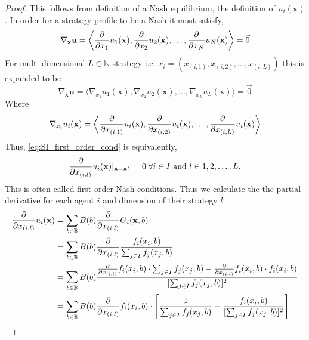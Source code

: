 \documentclass{article}
\newcommand {\N}{\mathbb{N}}
\newcommand {\B}{\mathbb{B}}
\begin{document}
            \begin{proof}
                This follows from definition of a Nash equilibrium, the definition of $u_i(\mathbf{x})$. In order for a strategy profile to be a Nash it must satisfy,
                \begin{equation}
                    \nabla_{\mathbf{x}}\mathbf{u}=\left\langle \pdv{}{x_1}u_1(\mathbf{x}),\pdv{}{x_2}u_2(\mathbf{x}),\dots, \pdv{}{x_N}u_N(\mathbf{x})\right\rangle =\Vec{0}
                \end{equation}
                For  multi dimensional $L\in \N$ strategy i.e. $x_i=(x_{(i,1)},x_{(i,2)},\dots,x_{(i,L)})$ this is expanded to be 
                \begin{equation}
                    \nabla_{\mathbf{x}}\mathbf{u}=\langle \nabla_{x_1}u_1(\mathbf{x}),\nabla_{x_2}u_2(\mathbf{x}),\dots,\nabla_{x_L}u_L(\mathbf{x}) \rangle =\Vec{0} \label{eq:SI_first_order_cond}
                \end{equation}
                Where 
                \begin{equation}
                   \nabla_{x_i}u_i(\mathbf{x})=\left\langle \pdv{}{x_{(i,1)}}u_i(\mathbf{x}),\pdv{}{x_{(i,2)}}u_i(\mathbf{x}),\dots, \pdv{}{x_{(i,L)}}u_i(\mathbf{x})\right\rangle
                \end{equation}
                Thus, \cref{eq:SI_first_order_cond} is equivalently,
                \begin{equation}
                    \pdv{}{x_{(i,l)}}u_i(\mathbf{x})|_{\mathbf{x}=\mathbf{x^*}}=0\; \forall i\in I \text{  and } l\in 1,2,\dots,L. 
                \end{equation}
                This is often called first order Nash conditions. Thus we calculate the the partial derivative for each agent $i$ and dimension of their strategy $l$.
                \begin{align}
                    \pdv{}{x_{(i,l)}}u_i(\mathbf{x})&=\sum_{b\in \B} B(b)\pdv{}{x_{(i,l)}}G_i(\mathbf{x},b) \\ %
                    &=\sum_{b\in \B} B(b)\pdv{}{x_{(i,l)}}\frac{f_{i}(x_i,b)}{\sum_{j\in I}f_{j}(x_j,b)} \\ %
                    &=\sum_{b\in \B} B(b)\frac{\pdv{}{x_{(i,l)}}f_{i}(x_i,b)\cdot \sum_{j\in I} f_{j}(x_j,b)-\pdv{}{x_{(i,l)}}f_{i}(x_i,b)\cdot f_{i}(x_i,b)}{[\sum_{j\in I} f_{j}(x_j,b)]^2} \\ %
                    &=\sum_{b\in \B} B(b) \pdv{}{x_{(i,l)}}f_{i}(x_i,b) \cdot \left[\frac{1}{\sum_{j\in I} f_{j}(x_j,b)}- \frac{f_{i}(x_i,b)}{[\sum_{j\in I} f_{j}(x_j,b)]^2}\right] \\ %

\end{align}
\end{proof}
\end{document}
